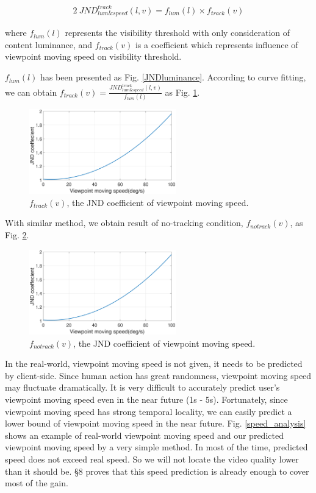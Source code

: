 \begin{alignat}{2}\
JND_{lum\&speed}^{track}(l, v) = f_{lum}(l) \times f_{track}(v)
\end{alignat}

where $f_{lum}(l)$ represents the visibility threshold with only consideration of content luminance, and $f_{track}(v)$ is a coefficient which represents influence of viewpoint moving speed on visibility threshold.

$f_{lum}(l)$ has been presented as Fig. \ref{JNDluminance}. According to curve fitting, we can obtain $f_{track}(v) = \frac{JND_{lum\&speed}^{track}(l, v)}{f_{lum}(l)}$ as Fig. \ref{JNDspeed-track}.

\begin{figure}
  \centering
  \includegraphics[width=2.5in]{images/JNDspeed.eps}
  \caption{$f_{track}(v)$, the JND coefficient of viewpoint moving speed.}
  \label{JNDspeed-track}
  \end{figure}

With similar method, we obtain result of no-tracking condition, $f_{notrack}(v)$, as Fig. \ref{JNDspeed-notrack}.

\begin{figure}
  \centering
  \includegraphics[width=2.5in]{images/JNDspeed.eps}
  \caption{$f_{notrack}(v)$, the JND coefficient of viewpoint moving speed.}
  \label{JNDspeed-notrack}
  \end{figure}

In the real-world, viewpoint moving speed is not given, it needs to be predicted by client-side. Since human action has great randomness, viewpoint moving speed may fluctuate dramatically. It is very difficult to accurately predict user's viewpoint moving speed even in the near future (1s - 5s). Fortunately, since viewpoint moving speed has strong temporal locality, we can easily predict a lower bound of viewpoint moving speed in the near future. Fig. \ref{speed_analysis} shows an example of real-world viewpoint moving speed and our predicted viewpoint moving speed by a very simple method. In most of the time, predicted speed does not exceed real speed. So we will not locate the video quality lower than it should be. \S 8 proves that this speed prediction is already enough to cover most of the gain.

